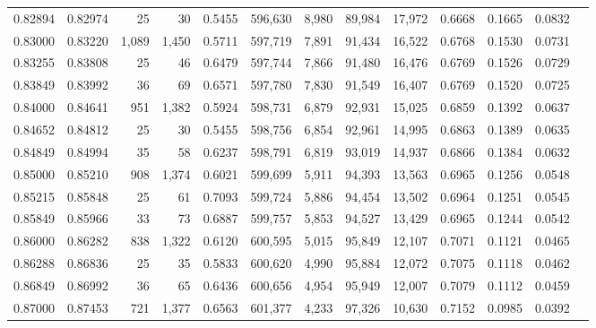 \begin{tabular}{rrrrrrrrrrrrr}
0.82894 & 0.82974 &     25 &    30 &                                     0.5455 & 596,630 &   8,980 &  89,984 &  17,972 & 0.6668 & 0.1665 & 0.0832 \\
0.83000 & 0.83220 &  1,089 & 1,450 &                                     0.5711 & 597,719 &   7,891 &  91,434 &  16,522 & 0.6768 & 0.1530 & 0.0731 \\
0.83255 & 0.83808 &     25 &    46 &                                     0.6479 & 597,744 &   7,866 &  91,480 &  16,476 & 0.6769 & 0.1526 & 0.0729 \\
0.83849 & 0.83992 &     36 &    69 &                                     0.6571 & 597,780 &   7,830 &  91,549 &  16,407 & 0.6769 & 0.1520 & 0.0725 \\
0.84000 & 0.84641 &    951 & 1,382 &                                     0.5924 & 598,731 &   6,879 &  92,931 &  15,025 & 0.6859 & 0.1392 & 0.0637 \\
0.84652 & 0.84812 &     25 &    30 &                                     0.5455 & 598,756 &   6,854 &  92,961 &  14,995 & 0.6863 & 0.1389 & 0.0635 \\
0.84849 & 0.84994 &     35 &    58 &                                     0.6237 & 598,791 &   6,819 &  93,019 &  14,937 & 0.6866 & 0.1384 & 0.0632 \\
0.85000 & 0.85210 &    908 & 1,374 &                                     0.6021 & 599,699 &   5,911 &  94,393 &  13,563 & 0.6965 & 0.1256 & 0.0548 \\
0.85215 & 0.85848 &     25 &    61 &                                     0.7093 & 599,724 &   5,886 &  94,454 &  13,502 & 0.6964 & 0.1251 & 0.0545 \\
0.85849 & 0.85966 &     33 &    73 &                                     0.6887 & 599,757 &   5,853 &  94,527 &  13,429 & 0.6965 & 0.1244 & 0.0542 \\
0.86000 & 0.86282 &    838 & 1,322 &                                     0.6120 & 600,595 &   5,015 &  95,849 &  12,107 & 0.7071 & 0.1121 & 0.0465 \\
0.86288 & 0.86836 &     25 &    35 &                                     0.5833 & 600,620 &   4,990 &  95,884 &  12,072 & 0.7075 & 0.1118 & 0.0462 \\
0.86849 & 0.86992 &     36 &    65 &                                     0.6436 & 600,656 &   4,954 &  95,949 &  12,007 & 0.7079 & 0.1112 & 0.0459 \\
0.87000 & 0.87453 &    721 & 1,377 &                                     0.6563 & 601,377 &   4,233 &  97,326 &  10,630 & 0.7152 & 0.0985 & 0.0392 \\

\end{tabular}
